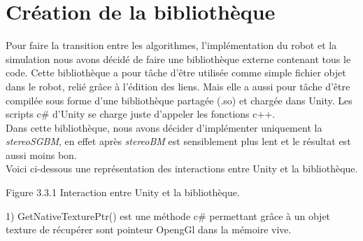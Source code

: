 \documentclass[12pt,a4paper]{report}
\begin{document}
\section{Création de la bibliothèque}
Pour faire la transition entre les algorithmes, l'implémentation du robot et la simulation nous avons décidé de faire une bibliothèque externe contenant tous le code.
Cette bibliothèque a pour tâche d'être utilisée comme simple fichier objet dans le robot, relié grâce à l'édition des liens. Mais elle a aussi pour tâche d'être compilée sous forme d'une bibliothèque partagée (.so) et chargée dans Unity. Les scripts c\# d'Unity se charge juste d'appeler les fonctions c++.\\
Dans cette bibliothèque, nous avons décider d'implémenter uniquement la \textit{stereoSGBM}, en effet après \textit{stereoBM} est sensiblement plus lent et le résultat est aussi moins bon.\\

Voici ci-dessous une représentation des interactions entre Unity et la bibliothèque.
\begin{center}

Figure 3.3.1 Interaction entre Unity et la bibliothèque.\\
\end{center}
\begin{small}
1) GetNativeTexturePtr() est une méthode c\# permettant grâce à un objet texture de récupérer sont pointeur OpengGl dans la mémoire vive.
\end{small}
\end{document}

